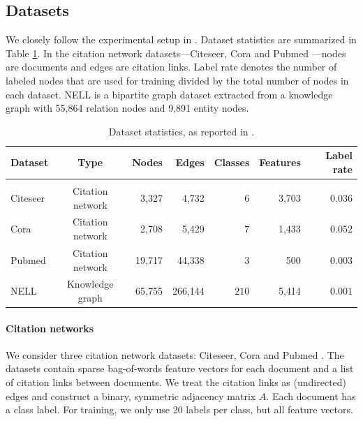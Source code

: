 \documentclass{article} %
\begin{document}
\subsection{Datasets}
\label{sec:datasets}
We closely follow the experimental setup in \cite{yang2016revisiting}. Dataset statistics are summarized in Table \ref{tab:datasets}. In the citation network datasets---Citeseer, Cora and Pubmed \citep{sen2008collective}---nodes are documents and edges are citation links. Label rate denotes the number of labeled nodes that are used for training divided by the total number of nodes in each dataset. NELL \citep{carlson2010toward, yang2016revisiting} is a bipartite graph dataset extracted from a knowledge graph with 55,864 relation nodes and 9,891 entity nodes.

\begin{table}[htp]
\centering
\caption{\label{tab:datasets}Dataset statistics, as reported in \cite{yang2016revisiting}.}
\begin{tabular}{l c r r r r r}
\textbf{Dataset} & \textbf{Type} & \textbf{Nodes} & \textbf{Edges} & \textbf{Classes} & \textbf{Features} & \textbf{Label rate}  \\[0.05em]\hline \\[-0.8em]
Citeseer & Citation network & 3,327 & 4,732 & $6$ & 3,703 & $0.036$ \\
Cora & Citation network & 2,708 & 5,429 & $7$ & 1,433 & $0.052$ \\
Pubmed & Citation network& 19,717 & 44,338 & $3$ & 500 & $0.003$ \\
NELL & Knowledge graph & 65,755 & 266,144 & $210$ & 5,414 & $0.001$ \\
\end{tabular}
\end{table}

\paragraph{Citation networks} We consider three citation network datasets: Citeseer, Cora and Pubmed \citep{sen2008collective}. The datasets contain sparse bag-of-words feature vectors for each document and a list of citation links between documents. We treat the citation links as (undirected) edges and construct a binary, symmetric adjacency matrix $A$. Each document has a class label. For training, we only use 20 labels per class, but all feature vectors.
\end{document}

